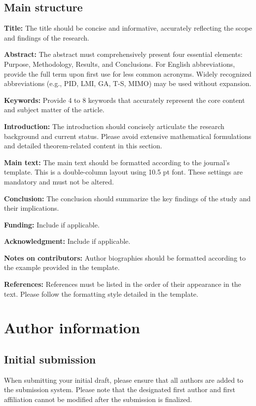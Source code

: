 \documentclass{jcd}
\theoremstyle{plain}
\theoremstyle{definition}
\begin{document}
\subsection{Main structure}

\textbf{Title:} The title should be concise and informative, accurately reflecting the scope and findings of the research.

\textbf{Abstract:} The abstract must comprehensively present four essential elements: Purpose, Methodology, Results, and Conclusions. For English abbreviations, provide the full term upon first use for less common acronyms. Widely recognized abbreviations (e.g., PID, LMI, GA, T-S, MIMO) may be used without expansion.

\textbf{Keywords:} Provide 4 to 8 keywords that accurately represent the core content and subject matter of the article.

\textbf{Introduction:} The introduction should concisely articulate the research background and current status. Please avoid extensive mathematical formulations and detailed theorem-related content in this section.

\textbf{Main text:} The main text should be formatted according to the journal's template. This is a double-column layout using 10.5 pt font. These settings are mandatory and must not be altered.

\textbf{Conclusion:} The conclusion should summarize the key findings of the study and their implications.

\textbf{Funding:} Include if applicable.

\textbf{Acknowledgment:} Include if applicable.

\textbf{Notes on contributors:} Author biographies should be formatted according to the example provided in the template.

\textbf{References:} References must be listed in the order of their appearance in the text. Please follow the formatting style detailed in the template.


\section{Author information}

\subsection{Initial submission}

When submitting your initial draft, please ensure that all authors are added to the submission system. Please note that the designated first author and first affiliation cannot be modified after the submission is finalized.
\end{document}
